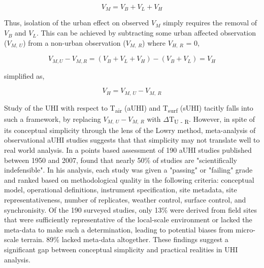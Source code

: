 \begin{bibunit}
\begin{equation}
	V_M = V_B + V_L + V_H
\end{equation}

Thus, isolation of the urban effect on observed $V_M$ simply requires the removal of $V_B$ and $V_L$. This can be achieved by subtracting some urban affected observation ($V_{M, \ U}$) from a non-urban observation ($V_{M, \ R}$) where $V_{H, \ R}$ = 0,

\begin{equation}
V_{M, U} - V_{M, R} = (V_B + V_L + V_H) - (V_B + V_L) = V_H
\end{equation}

\noindent simplified as,

\begin{equation}
	V_H = V_{M, \ U} - V_{M, \ R}
\end{equation}

Study of the UHI with respect to T\textsubscript{air} (aUHI) and T\textsubscript{surf} (sUHI) tacitly falls into such a framework, by replacing $V_{M, \ U} - V_{M, \ R}$ with $\Delta$T\textsubscript{U - R}. However, in spite of its conceptual simplicity through the lens of the Lowry method, meta-analysis of observational aUHI studies suggests that that simplicity may not translate well to real world analysis. In a points based assessment of 190 aUHI studies published between 1950 and 2007, \citet{Stewart2011} found that nearly 50\% of studies are "scientifically indefensible". In his analysis, each study was given a "passing" or "failing" grade and ranked based on methodological quality in the following criteria: conceptual model, operational definitions, instrument specification, site metadata, site representativeness, number of replicates, weather control, surface control, and synchronisity. Of the 190 surveyed studies, only 13\% were derived from field sites that were sufficiently representative of the local-scale environment or lacked the meta-data to make such a determination, leading to potential biases from micro-scale terrain. 89\% lacked meta-data altogether. These findings suggest a significant gap between conceptual simplicity and practical realities in UHI analysis.


\end{bibunit}
